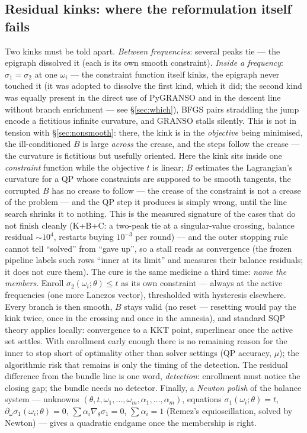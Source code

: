 \documentclass[11pt,a4paper]{article}
\newcommand{\rev}[1]{#1}
\newcommand{\revd}[1]{#1}
\begin{document}
\subsection{Residual kinks: where the reformulation itself fails}
\label{sec:kinks}
Two kinks must be told apart.  \emph{Between frequencies}: several peaks tie --- the
epigraph dissolved it (each is its own smooth constraint).  \emph{Inside a frequency}:
$\sigma_1=\sigma_2$ at one $\omega_i$ --- the constraint function itself kinks, the
epigraph never touched it (it was adopted to dissolve the first kind, which it did; the
second kind was equally present in the direct use of PyGRANSO and in the descent line
without branch enrichment --- see \S\ref{sec:which}), BFGS pairs straddling the jump
encode a fictitious infinite curvature, and GRANSO stalls silently.  \revd{This is not
in tension with \S\ref{sec:nonsmooth}: there, the kink is in the \emph{objective} being
minimised, the ill-conditioned $B$ is large \emph{across} the crease, and the steps
follow the crease --- the curvature is fictitious but usefully oriented.  Here the kink
sits inside one \emph{constraint} function while the objective $t$ is linear; $B$
estimates the Lagrangian's curvature for a QP whose constraints are supposed to be
smooth tangents, the corrupted $B$ has no crease to follow --- the crease of the
constraint is not a crease of the problem --- and the QP step it produces is simply
wrong, until the line search shrinks it to nothing.}  This is the measured signature of the cases that
do not finish cleanly (K+B+C: a two-peak tie at a singular-value crossing, balance
residual $\sim10^4$, restarts buying $10^{-3}$ per round) --- and the outer stopping rule
cannot tell ``solved'' from ``gave up'', so a stall reads as convergence (the frozen
pipeline labels such rows ``inner at its limit'' and measures their balance residuals; it
does not cure them).  The cure is the same medicine a third time: \emph{name the
members}.  Enroll $\sigma_2(\omega_i;\theta)\le t$ as its own constraint --- always at the
active frequencies (one more Lanczos vector), thresholded with hysteresis elsewhere.
Every branch is then smooth, $B$ stays valid (no reset --- resetting would pay the kink
twice, once in the crossing and once in the amnesia), and standard SQP theory applies
locally: convergence to a KKT point, superlinear once the active set settles.
\rev{With enrollment early enough there is no remaining reason for the inner to stop
short of optimality other than solver settings (QP accuracy, $\mu$); the algorithmic
risk that remains is only the timing of the detection.}  The
residual difference from the bundle line is one word, \emph{detection}: enrollment must
notice the closing gap; the bundle needs no detector.  Finally, a \emph{Newton polish} of
the balance system --- unknowns $(\theta,t,\omega_1,\dots,\omega_m,\alpha_1,\dots,\alpha_m)$,
equations $\sigma_1(\omega_i;\theta)=t$, $\partial_\omega\sigma_1(\omega_i;\theta)=0$,
$\sum\alpha_i\nabla_\theta\sigma_1=0$, $\sum\alpha_i=1$ (Remez's equioscillation, solved by
Newton) --- gives a quadratic endgame once the membership is right.
\end{document}
